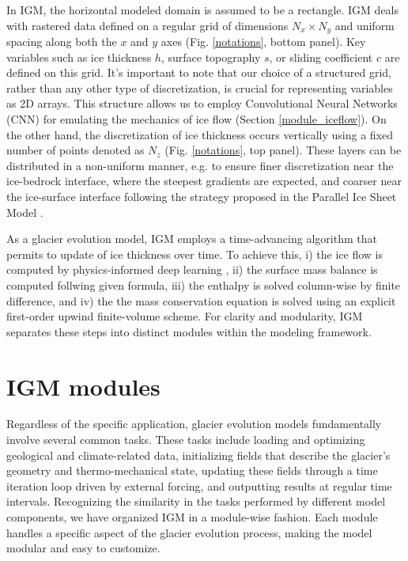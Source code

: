\documentclass[10pt,twocolumn]{article}
\begin{document}
In IGM, the horizontal modeled domain is assumed to be a rectangle. 
IGM deals with rastered data defined on a regular grid of dimensions $N_x \times N_y$ 
and uniform spacing along both the $x$ and $y$ axes (Fig. \ref{notations}, bottom panel). 
Key variables such as ice thickness $h$, 
surface topography $s$, or sliding coefficient $c$ are defined on this grid.
It's important to note that our choice of a structured grid, rather than any other type of
discretization, is crucial for representing variables as 2D arrays. This structure allows us 
to employ Convolutional Neural Networks (CNN) for emulating the mechanics of ice flow 
(Section \ref{module_iceflow}).
On the other hand, the discretization of ice thickness occurs vertically using a fixed 
number of points denoted as $N_z$ (Fig. \ref{notations}, top panel).
These layers can be distributed in a non-uniform manner, e.g. to ensure finer discretization
near the ice-bedrock interface, where the steepest gradients are expected, 
and coarser near the ice-surface interface following the strategy proposed in 
the Parallel Ice Sheet Model \citep[PISM,][]{pism-user-manual}.

As a glacier evolution model, IGM employs a time-advancing algorithm that permits to update
of ice thickness over time. To achieve this, i) the ice flow is computed by
physics-informed deep learning \citep{jouvet2023ice}, ii) the surface mass balance is 
computed follwing given formula, iii) the enthalpy is solved column-wise
by finite difference, and iv) the the mass conservation equation is solved using 
an explicit first-order upwind finite-volume scheme. For clarity and modularity, IGM 
separates these steps into distinct modules within the modeling framework.

\section{IGM modules} 

Regardless of the specific application, glacier evolution models fundamentally involve 
several common tasks. These tasks include loading and optimizing geological and 
climate-related data, initializing fields that describe the glacier's geometry 
and thermo-mechanical state, updating these fields through a time iteration loop 
driven by external forcing, and outputting results at regular time intervals.
Recognizing the similarity in the tasks performed by different model components,
we have organized IGM in a module-wise fashion. Each module handles a specific 
aspect of the glacier evolution process, making the model modular and easy to customize.
\end{document}
